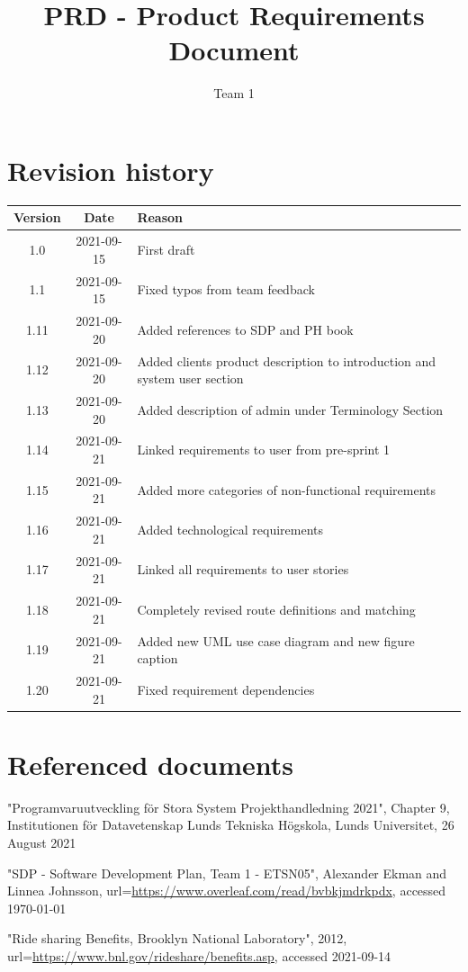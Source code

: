 \documentclass{article}
\title{PRD - Product Requirements Document}
\author{Team 1}
\begin{document}
\date{}
\maketitle
\thispagestyle{fancy}
\newpage

\tableofcontents

\section*{Revision history}
\begin{tabular}{ |c|c|l| } 
 \hline
 Version & Date & Reason \\ \hline \hline
 1.0 & 2021-09-15 & First draft \\ \hline
 1.1 & 2021-09-15 & Fixed typos from team feedback \\ \hline
 1.11 & 2021-09-20 & Added references to SDP and PH book\\\hline
 1.12 & 2021-09-20 & Added clients product description to introduction and system user section \\\hline
 1.13 & 2021-09-20 & Added description of admin under Terminology Section\\\hline
 1.14 & 2021-09-21 & Linked requirements to user from pre-sprint 1\\\hline
 1.15 & 2021-09-21 & Added more categories of non-functional requirements\\\hline
 1.16 & 2021-09-21 & Added technological requirements\\\hline
 1.17 & 2021-09-21 & Linked all requirements to user stories\\\hline
 1.18 & 2021-09-21 & Completely revised route definitions and matching\\\hline
 1.19 & 2021-09-21 & Added new UML use case diagram and new figure caption\\\hline
 1.20 & 2021-09-21 & Fixed requirement dependencies\\\hline
 
\end{tabular}

\newpage

\section{Referenced documents}
\begin{thebibliography}{widest entry}

     "Programvaruutveckling för Stora System Projekthandledning 2021", Chapter 9, Institutionen för Datavetenskap Lunds Tekniska Högskola, Lunds Universitet, 26 August 2021
    
     "SDP - Software Development Plan, Team 1 - ETSN05", Alexander Ekman and Linnea Johnsson, url=\url{https://www.overleaf.com/read/bvbkjmdrkpdx}, accessed \today
    
     "Ride sharing Benefits, Brooklyn National Laboratory", 2012, url=\url{https://www.bnl.gov/rideshare/benefits.asp}, accessed 2021-09-14
    
\end{thebibliography}
\end{document}
